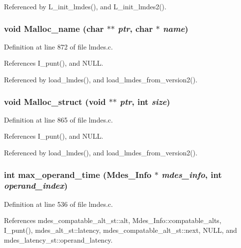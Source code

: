 Referenced by L\_\-init\_\-lmdes(), and L\_\-init\_\-lmdes2().
\subsubsection{\setlength{\rightskip}{0pt plus 5cm}void Malloc\_\-name (char $\ast$$\ast$ {\em ptr}, char $\ast$ {\em name})}\label{lmdes_8c_94186a85a4489b80b7d305e6e13fec4c}




Definition at line 872 of file lmdes.c.

References I\_\-punt(), and NULL.

Referenced by load\_\-lmdes(), and load\_\-lmdes\_\-from\_\-version2().
\subsubsection{\setlength{\rightskip}{0pt plus 5cm}void Malloc\_\-struct (void $\ast$$\ast$ {\em ptr}, int {\em size})}\label{lmdes_8c_44598a63bd3f29a90fdd27cb3531aff7}




Definition at line 865 of file lmdes.c.

References I\_\-punt(), and NULL.

Referenced by load\_\-lmdes(), and load\_\-lmdes\_\-from\_\-version2().
\subsubsection{\setlength{\rightskip}{0pt plus 5cm}int max\_\-operand\_\-time (\bf{Mdes\_\-Info} $\ast$ {\em mdes\_\-info}, int {\em operand\_\-index})}\label{lmdes_8c_447043ce5a84413cb09ce4eb5ff1050c}




Definition at line 536 of file lmdes.c.

References mdes\_\-compatable\_\-alt\_\-st::alt, Mdes\_\-Info::compatable\_\-alts, I\_\-punt(), mdes\_\-alt\_\-st::latency, mdes\_\-compatable\_\-alt\_\-st::next, NULL, and mdes\_\-latency\_\-st::operand\_\-latency.
